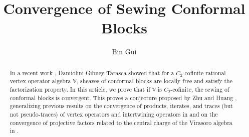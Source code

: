 \documentclass[11pt,b5paper,notitlepage]{article}
\title{Convergence of Sewing Conformal Blocks}
\author{{\sc Bin Gui}
}
\date{}
\theoremstyle{definition}
\theoremstyle{plain}
\newcommand{\Vbb}{\mathbb V}
\numberwithin{equation}{section}
\begin{document}
\sloppy %



	\maketitle









\tableofcontents


	











\newpage


\begin{abstract}
In a recent work \cite{DGT19b}, Damiolini-Gibney-Tarasca showed that for a $C_2$-cofinite rational vertex operator algebra $\Vbb$, sheaves of conformal blocks are locally free and satisfy the factorization property. In this article, we  prove that if $\Vbb$ is $C_2$-cofinite, the sewing of conformal blocks is convergent. This proves a conjecture proposed by Zhu \cite{Zhu94} and Huang \cite{Hua16}, generalizing previous results on the convergence of products, iterates, and traces (but not pseudo-traces) of vertex operators and intertwining operators in \cite{Zhu96,Hua97b,Hua05b,HLZ11} and on the convergence of projective factors related to the central charge of the Virasoro algebra in \cite{Hua97a}.
\end{abstract}
\end{document}
